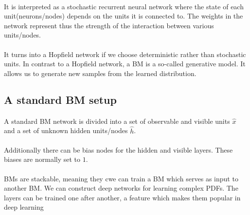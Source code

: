 \documentclass[aip,jcp,reprint,floatfix]{revtex4-1}
\begin{document}
\begin{itemize}
\paragraph{}
It is interpreted as a stochastic recurrent neural network where the
state of each unit(neurons/nodes) depends on the units it is connected
to. The weights in the network represent thus the strength of the
interaction between various units/nodes.



\paragraph{}
It turns into a Hopfield network if we choose deterministic rather
than stochastic units. In contrast to a Hopfield network, a BM is a
so-called generative model. It allows us to generate new samples from
the learned distribution.



\subsection*{A standard BM setup}


\paragraph{}
A standard BM network is divided into a set of observable and visible units $\hat{x}$ and a set of unknown hidden units/nodes $\hat{h}$.




\paragraph{}
Additionally there can be bias nodes for the hidden and visible layers. These biases are normally set to $1$.




\paragraph{}
BMs are stackable, meaning they cwe can train a BM which serves as input to another BM. We can construct deep networks for learning complex PDFs. The layers can be trained one after another, a feature which makes them popular in deep learning




\end{itemize}
\end{document}
